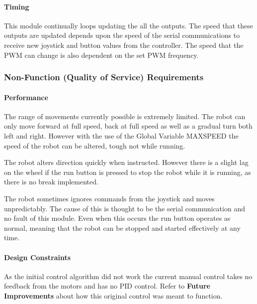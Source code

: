 \documentclass[MTRX3700report.tex]{subfiles}
\begin{document}
	\paragraph{Timing}
	
	This module continually loops updating the all the outputs. The speed that these outputs are updated depends upon the speed of the serial communications to receive new joystick and button values from the controller. The speed that the PWM can change is also dependent on the set PWM frequency.
	
	
	\subsubsection{Non-Function (Quality of Service) Requirements}
	\paragraph{Performance}
	
	The range of movements currently possible is extremely limited. The robot can only move forward at full speed, back at full speed as well as a gradual turn both left and right. However with the use of the Global Variable MAX\textunderscore SPEED the speed of the robot can be altered, tough not while running.
	
	The robot alters direction quickly when instructed. However there is a slight lag on the wheel if the run button is pressed to stop the robot while it is running, as there is no break implemented.
	
	The robot sometimes ignores commands from the joystick and moves unpredictably. The cause of this is thought to be the serial communication and no fault of this module. Even when this occurs the run button operates as normal, meaning that the robot can be stopped and started effectively at any time.
	
	
	\paragraph{Design Constraints}
	As the initial control algorithm did not work the current manual control takes no feedback from the motors and has no PID control. Refer to \textbf{Future Improvements} about how this original control was meant to function.
	
\end{document}
